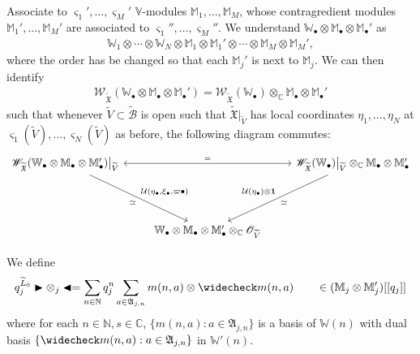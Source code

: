 \documentclass[12pt,a4paper,notitlepage]{article}
\theoremstyle{definition}
\theoremstyle{plain}
\newcommand{\fk}{\mathfrak}
\newcommand{\mc}{\mathcal}
\newcommand{\wtd}{\widetilde}
\newcommand{\wch}{\widecheck}
\newcommand{\id}{\mathbf{1}}
\newcommand{\scr}{\mathscr}
\newcommand{\sgm}{\varsigma}
\newcommand{\blt}{\bullet}
\newcommand{\Vbb}{\mathbb V}
\newcommand{\Wbb}{\mathbb W}
\newcommand{\Mbb}{\mathbb M}
\newcommand{\Cbb}{\mathbb C}
\newcommand{\Nbb}{\mathbb N}
\newcommand{\btl}{\blacktriangleleft}
\newcommand{\btr}{\blacktriangleright}
\numberwithin{equation}{section}
\begin{document}
Associate to $\sgm_1',\dots,\sgm_M'$  $\Vbb$-modules $\Mbb_1,\dots,\Mbb_M$, whose contragredient modules $\Mbb_1',\dots,\Mbb_M'$ are associated to $\sgm_1'',\dots,\sgm_M''$. We understand $\Wbb_\blt\otimes\Mbb_\blt\otimes\Mbb_\blt'$ as
\begin{gather*}
\Wbb_1\otimes\cdots\otimes \Wbb_N\otimes\Mbb_1\otimes\Mbb_1'\otimes\cdots\otimes\Mbb_M\otimes\Mbb_M',
\end{gather*}
where the order has be changed so that each $\Mbb_j'$ is next to $\Mbb_j$. We can then identify
\begin{align}\label{eq27}
\scr W_{\wtd{\fk X}}(\Wbb_\blt\otimes\Mbb_\blt\otimes\Mbb_\blt')=\scr W_{\wtd{\fk X}}(\Wbb_\blt)\otimes_\Cbb\Mbb_\blt\otimes\Mbb_\blt'	
\end{align}
such that whenever $\wtd V\subset\wtd{\mc B}$ is open such that $\wtd{\fk X}|_{\wtd V}$ has local coordinates $\eta_1,\dots,\eta_N$ at $\sgm_1(\wtd V),\dots,\sgm_N(\wtd V)$ as before, the following diagram commutes:
\begin{equation}
\begin{tikzcd}
\scr W_{\wtd{\fk X}}(\Wbb_\blt\otimes\Mbb_\blt\otimes\Mbb_\blt')\big|_{\wtd V} \arrow[rr,leftrightarrow,"="] \arrow[ddr,"\simeq"',"{\mc U(\eta_\blt,\xi_\blt,\varpi\blt)}"] &&\scr W_{\wtd{\fk X}}(\Wbb_\blt)\big|_{\wtd V}\otimes_\Cbb\Mbb_\blt\otimes\Mbb_\blt'\arrow[ddl,"\simeq","\mc U(\eta_\blt)\otimes\id"']\\{}\\
&\Wbb_\blt\otimes\Mbb_\blt\otimes\Mbb_\blt'\otimes_\Cbb\scr O_{\wtd V} 
\end{tikzcd}	
\end{equation}

We define
\begin{gather*}
q_j^{\wtd L_0}\btr\otimes_j\btl=\sum_{n\in\Nbb} q_j^n\sum_{a\in\fk A_{j,n}} m{(n,a)}\otimes\wch m{(n,a)}\qquad \in(\Mbb_j\otimes\Mbb_j')[[q_j]]
\end{gather*}
where for each $n\in\Nbb,s\in\Cbb$, $\{m{(n,a)}:a\in\fk A_{j,n}\}$ is a basis of $\Wbb{(n)}$ with dual basis	$\{\wch m{(n,a)}:a\in\fk A_{j,n}\}$ in $\Wbb'{(n)}$.

	
	
\end{document}
